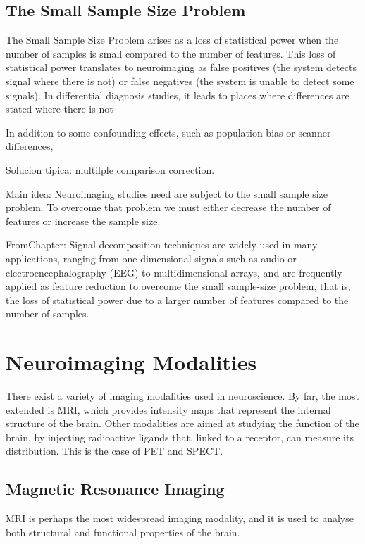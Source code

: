 \subsection{The Small Sample Size Problem}
The Small Sample Size Problem arises as a loss of statistical power when the number of samples is small compared to the number of features. This loss of statistical power translates to neuroimaging as false positives (the system detects signal where there is not) or false negatives (the system is unable to detect some signals). In differential diagnosis studies, it leads to places where differences are stated where there is not 

In addition to some confounding effects, such as population bias or scanner differences, 


Solucion tipica: multilple comparison correction. 



Main idea: Neuroimaging studies need are subject to the small sample size problem. To overcome that problem we must either decrease the number of features or increase the sample size. 


FromChapter: Signal decomposition techniques are widely used in many applications, ranging from one-dimensional signals such as audio or electroencephalography (EEG) to multidimensional arrays, and are frequently applied as feature reduction to overcome the small sample-size problem, that is, the loss of statistical power due to a larger number of features compared to the number of samples.


\section{Neuroimaging Modalities}
There exist a variety of imaging modalities used in neuroscience. By far, the most extended is \ac{MRI}, which provides intensity maps that represent the internal structure of the brain. Other modalities are aimed at studying the function of the brain, by injecting radioactive ligands that, linked to a receptor, can measure its distribution. This is the case of \ac{PET} and \ac{SPECT}.

\subsection{Magnetic Resonance Imaging}
\acf{MRI} is perhaps the most widespread imaging modality, and it is used to analyse both structural and functional properties of the brain. 

